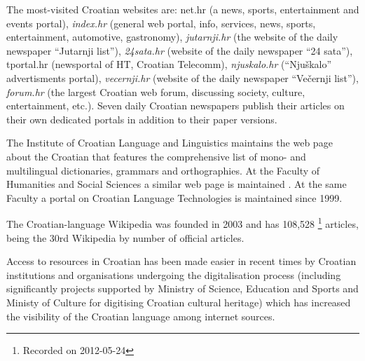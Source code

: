 \begin{multicols}{2}
The most-visited Croatian websites are: net.hr (a news, sports, entertainment and events portal), \emph{index.hr} (general web portal, info, services, news, sports, entertainment, automotive, gastronomy), \emph{jutarnji.hr} (the website of the daily newspaper “Jutarnji list”), \emph{24sata.hr} (website of the daily newspaper “24 sata”), tportal.hr (newsportal of HT, Croatian Telecomm), \emph{njuskalo.hr} (“Njuškalo” advertisments portal), \emph{vecernji.hr} (website of the daily newspaper “Večernji list”), \emph{forum.hr} (the largest Croatian web forum, discussing society, culture, entertainment, etc.). Seven daily Croatian newspapers publish their articles on their own dedicated portals in addition to their paper versions.


The Institute of Croatian Language and Linguistics maintains the web page about the Croatian that features the comprehensive list of mono- and multilingual dictionaries, grammars and orthographies. At the Faculty of Humanities and Social Sciences a similar web page is maintained \cite{str11}. At the same Faculty a portal on Croatian Language Technologies \cite{str12} is maintained since 1999.

The Croatian-language Wikipedia was founded in 2003 and has 108,528 \footnote{Recorded on 2012-05-24} articles, being the 30rd Wikipedia by number of official articles.

Access to resources in Croatian has been made easier in recent times by Croatian institutions and organisations undergoing the digitalisation process (including significantly projects supported by Ministry of Science, Education and Sports and Ministy of Culture for digitising Croatian cultural heritage) which has increased the visibility of the Croatian language among internet sources.
\end{multicols}

\clearpage


